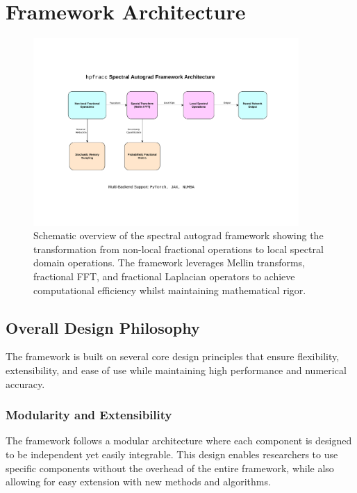 \section{Framework Architecture}

\begin{figure}[h]
\centering
\includegraphics[width=0.9\textwidth]{figures/architecture_overview.pdf}
\caption{Schematic overview of the \hpfracc spectral autograd framework showing the transformation from non-local fractional operations to local spectral domain operations. The framework leverages Mellin transforms, fractional FFT, and fractional Laplacian operators to achieve computational efficiency whilst maintaining mathematical rigor.}
\label{fig:architecture_overview}
\end{figure}

\subsection{Overall Design Philosophy}

The \hpfracc framework is built on several core design principles that ensure flexibility, extensibility, and ease of use while maintaining high performance and numerical accuracy.

\subsubsection{Modularity and Extensibility}

The framework follows a modular architecture where each component is designed to be independent yet easily integrable. This design enables researchers to use specific components without the overhead of the entire framework, while also allowing for easy extension with new methods and algorithms.

